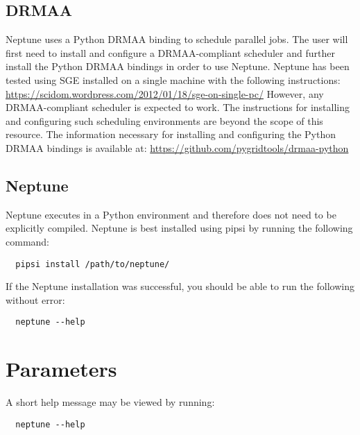 \documentclass[a4paper,10pt]{article}
\begin{document}
\subsection{DRMAA}

Neptune uses a Python DRMAA binding to schedule parallel jobs. The user will first need to install and configure a DRMAA-compliant scheduler and further install the Python DRMAA bindings in order to use Neptune. Neptune has been tested using SGE installed on a single machine with the following instructions:
\newline\newline
\url{https://scidom.wordpress.com/2012/01/18/sge-on-single-pc/}
\newline\newline
However, any DRMAA-compliant scheduler is expected to work. The instructions for installing and configuring such scheduling environments are beyond the scope of this resource. The information necessary for installing and configuring the Python DRMAA bindings is available at:
\newline\newline
\url{https://github.com/pygridtools/drmaa-python}

\subsection{Neptune}

Neptune executes in a Python environment and therefore does not need to be explicitly compiled. Neptune is best installed using pipsi by running the following command:

\begin{verbatim}
  pipsi install /path/to/neptune/
\end{verbatim}

If the Neptune installation was successful, you should be able to run the following without error:

\begin{verbatim}
  neptune --help
\end{verbatim}

\newpage
\section{Parameters}

A short help message may be viewed by running:

\begin{verbatim}
  neptune --help
\end{verbatim}
\end{document}
